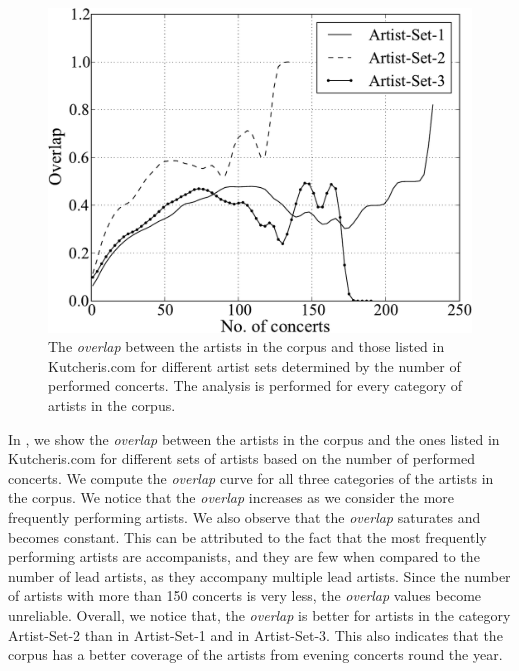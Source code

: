 \begin{figure}
	\begin{center}
		\includegraphics[width=\figSizeSixtyFive]{ch04_datasets/figures/artist-coverage-vs-performances.pdf}
	\end{center}
	\caption[Overlap between the artists in the Carnatic music corpus and Kutcheris.com]{The \textit{overlap} between the artists in the corpus and those listed in Kutcheris.com for different artist sets determined by the number of performed concerts. The analysis is performed for every category of artists in the corpus.}
	\label{fig:artist_coverage_vs_number_of_concerts}
\end{figure}

In , we show the \textit{overlap} between the artists in the corpus and the ones listed in Kutcheris.com for different sets of artists based on the number of performed concerts. We compute the \textit{overlap} curve for all three categories of the artists in the corpus. We notice that the \textit{overlap} increases as we consider the more frequently performing artists. We also observe that the \textit{overlap} saturates and becomes constant. This can be attributed to the fact that the most frequently performing artists are accompanists, and they are few when compared to the number of lead artists, as they accompany multiple lead artists. Since the number of artists with more than 150 concerts is very less, the \textit{overlap}
values become unreliable. Overall, we notice that, the \textit{overlap} is better for artists in the category Artist-Set-2 than in Artist-Set-1 and in Artist-Set-3. This also indicates that the corpus has a better coverage of the artists from evening concerts round the year.


